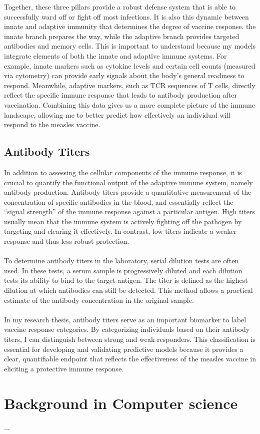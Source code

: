 \documentclass[12pt,a4paper]{report}
\begin{document}
Together, these three pillars provide a robust defense system that is able to successfully ward off or fight off most infections. It is also this dynamic between innate and adaptive immunity that determines the degree of vaccine response. the innate branch prepares the way, while the adaptive branch provides targeted antibodies and memory cells. This is important to understand because my models integrate elements of both the innate and adaptive immune systems. For example, innate markers such as cytokine levels and certain cell counts (measured via cytometry) can provide early signals about the body's general readiness to respond. Meanwhile, adaptive markers, such as TCR sequences of T cells, directly reflect the specific immune response that leads to antibody production after vaccination. Combining this data gives us a more complete picture of the immune landscape, allowing me to better predict how effectively an individual will respond to the measles vaccine.

\subsection{Antibody Titers }
In addition to assessing the cellular components of the immune response, it is crucial to quantify the functional output of the adaptive immune system, namely antibody production. Antibody titers provide a quantitative measurement of the concentration of specific antibodies in the blood, and essentially reflect the “signal strength” of the immune response against a particular antigen. High titers usually mean that the immune system is actively fighting off the pathogen by targeting and clearing it effectively. In contrast, low titers indicate a weaker response and thus less robust protection.\\
\\
To determine antibody titers in the laboratory, serial dilution tests are often used. In these tests, a serum sample is progressively diluted and each dilution tests its ability to bind to the target antigen. The titer is defined as the highest dilution at which antibodies can still be detected. This method allows a practical estimate of the antibody concentration in the original sample.\\
\\
In my research thesis, antibody titers serve as an important biomarker to label vaccine response categories. By categorizing individuals based on their antibody titers, I can distinguish between strong and weak responders. This classification is essential for developing and validating predictive models because it provides a clear, quantifiable endpoint that reflects the effectiveness of the measles vaccine in eliciting a protective immune response.

\pagebreak
\section{Background in Computer science}
...



\end{document}
